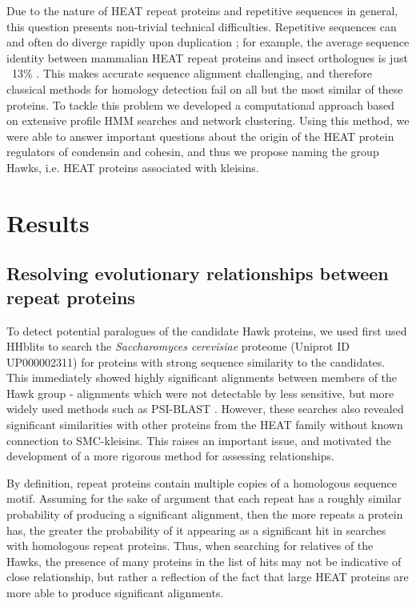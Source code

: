 \documentclass[a4paper,11pt,twoside,openright]{scrbook}
\begin{document}
Due to the nature of HEAT repeat proteins and repetitive sequences in general, this question presents non-trivial technical difficulties. Repetitive sequences can and often do diverge rapidly upon duplication \cite{Persi2016}; for example, the average sequence identity between mammalian HEAT repeat proteins and insect orthologues is just ~13\% \cite{Andrade2001c}. This makes accurate sequence alignment challenging, and therefore classical methods for homology detection fail on all but the most similar of these proteins. To tackle this problem we developed a computational approach based on extensive profile HMM searches and network clustering. Using this method, we were able to answer important questions about the origin of the HEAT protein regulators of condensin and cohesin, and thus we propose naming the group Hawks, i.e. HEAT proteins associated with kleisins.

\section{Results}
\subsection{Resolving evolutionary relationships between repeat proteins}
To detect potential paralogues of the candidate Hawk proteins, we used first used HHblits \cite{Remmert2011} to search the \textit{Saccharomyces cerevisiae} proteome (Uniprot ID UP000002311) for proteins with strong sequence similarity to the candidates. This immediately showed highly significant alignments between members of the Hawk group - alignments which were not detectable by less sensitive, but more widely used methods such as PSI-BLAST \cite{Altschul1997}. However, these searches also revealed significant similarities with other proteins from the HEAT family without known connection to SMC-kleisins. This raises an important issue, and motivated the development of a more rigorous method for assessing relationships.

By definition, repeat proteins contain multiple copies of a homologous sequence motif. Assuming for the sake of argument that each repeat has a roughly similar probability of producing a significant alignment, then the more repeats a protein has, the greater the probability of it appearing as a significant hit in searches with homologous repeat proteins. Thus, when searching for relatives of the Hawks, the presence of many proteins in the list of hits may not be indicative of close relationship, but rather a reflection of the fact that large HEAT proteins are more able to produce significant alignments.
\end{document}
